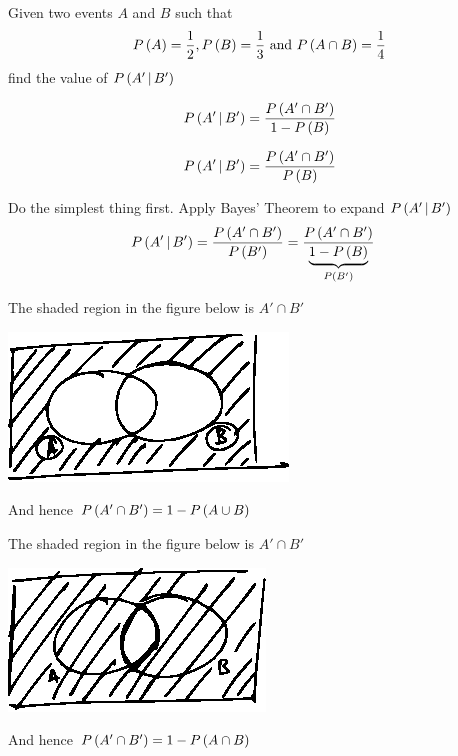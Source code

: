 \documentclass[14pt,fleqn]{extarticle}
\begin{document}
 
\begin{problem}
	\statement 
    
    Given two events $A$ and $B$ such that 
    \[ P\left( A\right) = \frac{1}{2}, P\left( B\right) = \frac{1}{3} \text{ and } P\left( A\cap B\right) = \frac{1}{4} \]
    find the value of $P\left(A'\,\vert\,B'\right)$ 
          
          
   \begin{step}
  \begin{options} 
     \correct 
       
       \[ P\left(A'\,\vert\,B'\right) = \dfrac{P\left( A'\cap B'\right)}{1-P\left( B\right)} \]
       
     \incorrect
        
     \[ P\left(A'\,\vert\,B'\right) = \dfrac{P\left( A'\cap B'\right)}{P\left( B\right)} \]
     
    \end{options} 
     \reason 
     
     Do the simplest thing first. Apply Bayes' Theorem to expand $P\left(A'\,\vert\,B'\right)$
     \begin{align}
	P\left(A'\,\vert\,B'\right) &= \dfrac{P\left( A'\cap B'\right)}{P\left( B'\right)} = \dfrac{P\left( A'\cap B'\right)}{\underbrace{1-P\left( B\right)}_{P\left( B'\right)}} 
\end{align}
       
\end{step}

\begin{step}
  \begin{options} 
     \correct 
       
       The shaded region in the figure below is $A'\cap B'$ 
       
       \begin{center}
\includegraphics[scale=1.5]{1411-A.eps}
\end{center}
       And hence $P\left( A'\cap B'\right) =  1-P\left( A\cup B\right)$ 
       
     \incorrect
        
        The shaded region in the figure below is $A'\cap B'$ 
       
       \begin{center}
\includegraphics[scale=1.5]{1411-B.eps}
\end{center}
       And hence $P\left( A'\cap B'\right) =  1-P\left( A\cap B\right)$ 
    \end{options} 
     \reason 
       

\end{step}
\end{problem}
\end{document}
